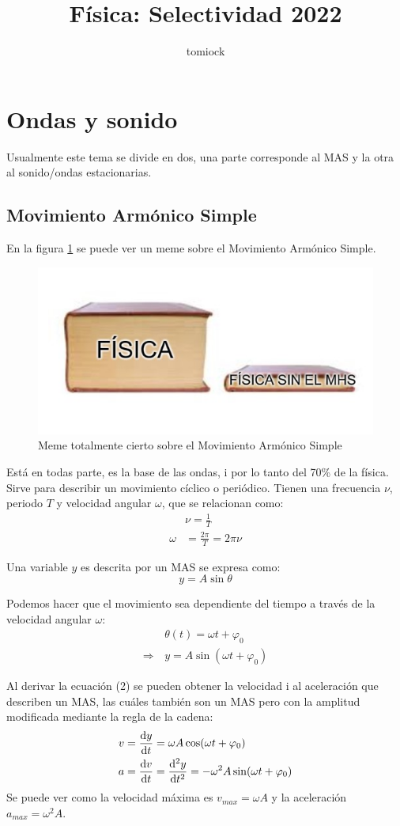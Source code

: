 \documentclass[arial,a4paper,print]{article}
\title{Física: Selectividad 2022}
\author{tomiock}
\begin{document}
\maketitle

\section{Ondas y sonido}
Usualmente este tema se divide en dos, una parte corresponde al MAS y la otra al sonido/ondas estacionarias.
\subsection{Movimiento Armónico Simple}
En la figura \ref{fig:mememhs} se puede ver un meme sobre el Movimiento Armónico Simple.
\begin{figure}[h]
	\centering
	\includegraphics[width=0.3\linewidth]{figures/meme_MHS}
	\caption{Meme totalmente cierto sobre el Movimiento Armónico Simple}
	\label{fig:mememhs}
\end{figure}

Está en todas parte, es la base de las ondas, i por lo tanto del 70\% de la física. Sirve para describir un movimiento cíclico o periódico. Tienen una frecuencia $\nu$, periodo $T$ y velocidad angular $\omega$, que se relacionan como:
\begin{align*}
	&\nu = \frac1T \\
	\omega &= \frac{2\pi}{T} = 2\pi\nu
\end{align*}

Una variable $y$ es descrita por un MAS se expresa como:
\begin{equation*}
	y = A\sin\theta
\end{equation*}

Podemos hacer que el movimiento sea dependiente del tiempo a través de la velocidad angular $\omega$:
\begin{align}
	& \theta(t) = \omega t + \varphi_{0} \\
	\Rightarrow \,& y = A\sin(\omega t + \varphi_{0})
\end{align}

Al derivar la ecuación (2) se pueden obtener la velocidad i al aceleración que describen un MAS, las cuáles también son un MAS pero con la amplitud modificada mediante la regla de la cadena:
\begin{align*}
	 v &= \dv{y}{t} = \omega A \cos(\omega t + \varphi_{0}) \\
	 a &= \dv{v}{t} = \dv[2]{y}{t} = -\omega^{2}A\sin(\omega t + \varphi_{0})
\end{align*}
 Se puede ver como la velocidad máxima es $v_{max} = \omega A$ y la aceleración $a_{max} = \omega^{2}A$.
\end{document}
